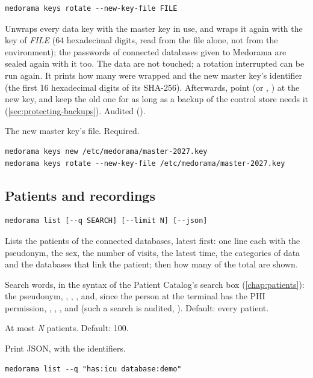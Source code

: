 \begin{lstlisting}[style=signature]
medorama keys rotate --new-key-file FILE
\end{lstlisting}
Unwraps every data key with the master key in use, and wraps it again with the key of
\textit{FILE} (64 hexadecimal digits, read from the file alone, not from the environment); the
passwords of connected databases given to Medorama are sealed again with it too. The data are
not touched; a rotation interrupted can be run again. It prints how many were wrapped and the new master key's identifier
(the first 16 hexadecimal digits of its SHA-256). Afterwards, point  (or
, ) at the new key, and keep the old one
for as long as a backup of the control store needs it (\cref{sec:protecting-backups}). Audited
().
\begin{params}
\item[--new-key-file FILE] The new master key's file. Required.
\end{params}
\begin{lstlisting}[style=shell]
medorama keys new /etc/medorama/master-2027.key
medorama keys rotate --new-key-file /etc/medorama/master-2027.key
\end{lstlisting}

\subsection{Patients and recordings}
\label{sec:cli-encounters}

\begin{lstlisting}[style=signature]
medorama list [--q SEARCH] [--limit N] [--json]
\end{lstlisting}
Lists the patients of the connected databases, latest first: one line each with the pseudonym,
the sex, the number of visits, the latest time, the categories of data and the databases that
link the patient; then how many of the total are shown.
\begin{params}
\item[--q SEARCH] Search words, in the syntax of the Patient Catalog's search box
  (\cref{chap:patients}): the pseudonym, , , , and, since
  the person at the terminal has the PHI permission, , , ,
   and  (such a search is audited, ). Default: every
  patient.
\item[--limit N] At most \textit{N} patients. Default: 100.
\item[--json] Print JSON, with the identifiers\phimark{}.
\end{params}
\begin{lstlisting}[style=shell]
medorama list --q "has:icu database:demo"
\end{lstlisting}

